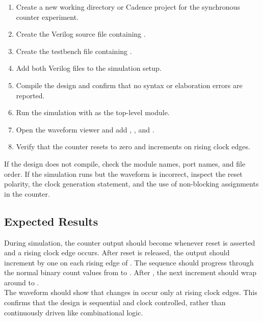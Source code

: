 \begin{enumerate}
    \item Create a new working directory or Cadence project for the synchronous counter experiment.
    \item Create the Verilog source file containing .
    \item Create the testbench file containing .
    \item Add both Verilog files to the simulation setup.
    \item Compile the design and confirm that no syntax or elaboration errors are reported.
    \item Run the simulation with  as the top-level module.
    \item Open the waveform viewer and add , , and
    .
    \item Verify that the counter resets to zero and increments on rising clock edges.
\end{enumerate}


\noindent If the design does not compile, check the module names, port names, and file order. If
the simulation runs but the waveform is incorrect, inspect the reset polarity, the clock generation
statement, and the use of non-blocking assignments in the counter.

\subsection{Expected Results}
During simulation, the counter output should become  whenever reset is asserted and
a rising clock edge occurs. After reset is released, the output should increment by one on each
rising edge of . The sequence should progress through the normal binary count values
from  to . After , the next increment should wrap
around to .\\

\noindent The waveform should show that changes in  occur only at rising clock
edges. This confirms that the design is sequential and clock controlled, rather than continuously
driven like combinational logic.

